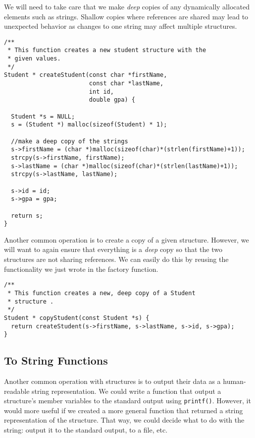 We will need to take care that we make \emph{deep} copies of 
any dynamically allocated elements such as strings.  Shallow
copies where references are shared may lead to unexpected 
behavior as changes to one string may affect multiple structures.

\begin{verbatim}
/**
 * This function creates a new student structure with the
 * given values.
 */
Student * createStudent(const char *firstName, 
                        const char *lastName, 
                        int id, 
                        double gpa) {

  Student *s = NULL;
  s = (Student *) malloc(sizeof(Student) * 1);

  //make a deep copy of the strings
  s->firstName = (char *)malloc(sizeof(char)*(strlen(firstName)+1));
  strcpy(s->firstName, firstName);
  s->lastName = (char *)malloc(sizeof(char)*(strlen(lastName)+1));
  strcpy(s->lastName, lastName);

  s->id = id;
  s->gpa = gpa;

  return s;
}
\end{verbatim}

Another common operation is to create a copy of a given structure.
However, we will want to again ensure that everything is a \emph{deep}
copy so that the two structures are not sharing references.  We
can easily do this by reusing the functionality we just wrote in
the factory function.

\begin{verbatim}
/**
 * This function creates a new, deep copy of a Student 
 * structure .
 */
Student * copyStudent(const Student *s) {
  return createStudent(s->firstName, s->lastName, s->id, s->gpa);
}
\end{verbatim}

\subsection{To String Functions}

Another common operation with structures is to output their data
as a human-readable string representation.  We could write
a function that output a structure's member variables to the standard
output using \texttt{printf()}.  However, it would more 
useful if we created a more general function that returned a 
string representation of the structure.  That way, we could decide
what to do with the string: output it to the standard output,
to a file, etc.


